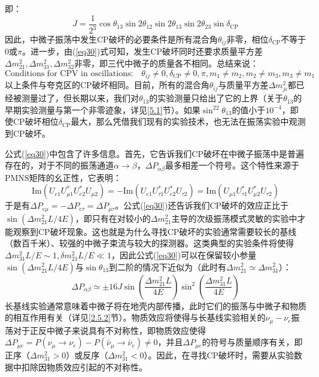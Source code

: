 \documentclass{article}
\begin{document}
	即：
	\begin{equation*}
		J=\frac{1}{2^3}\cos\theta_{13}\sin2\theta_{12}\sin2\theta_{13}\sin2\theta_{23}\sin\delta_{\mathrm{CP}}
	\end{equation*}
	因此，中微子振荡中发生CP破坏的必要条件是所有混合角$\theta_{ij}$非零，相位$\delta_\mathrm{CP}$不等于$0$或$\pi$。进一步，由(\ref{eq30})式可知，发生CP破坏同时还要求质量平方差$\Delta m_{21}^2,\Delta m_{31}^2,\Delta m_{32}^2$非零，即三代中微子的质量各不相同。总结来说：
	\begin{equation}
		\text{Conditions for CPV in oscillations:}\quad\theta_{ij}\neq0, \delta_{\mathrm{CP}}\neq0,\pi, m_{1}\neq m_{2}, m_{2}\neq m_{3}, m_{3}\neq m_{1}
	\end{equation}
	以上条件与夸克区的CP破坏相同。目前，所有的混合角$\theta_{ij}$与质量平方差$\Delta m_{ji}^2$都已经被测量过了，但长期以来，我们对$\theta_{13}$的实验测量只给出了它的上界（关于$\theta_{13}$的早期实验测量与第一个非零迹象，详见\ref{5.1}节）。如果$\sin^22\theta_{13}$的值小于$10^{-4}$，即使CP破坏相位$\delta_\mathrm{CP}$最大，那么凭借我们现有的实验技术，也无法在振荡实验中观测到CP破坏。
	
	公式(\ref{eq30})中包含了许多信息。首先，它告诉我们CP破坏在中微子振荡中是普遍存在的，对于不同的振荡通道$\alpha\to\beta$，$\Delta P_{\alpha\beta}$最多相差一个符号。这个特性来源于PMNS矩阵的幺正性，它表明：
	\begin{equation}
		\mathrm{Im}(U_{e1}U_{\mu1}^*U_{e2}^*U_{\mu2})=-\mathrm{Im}(U_{e1}U_{\tau1}^*U_{e2}^*U_{\tau2})=\mathrm{Im}(U_{\mu1}U_{\tau1}^*U_{\mu2}^*U_{\tau2})
	\end{equation}
	于是有$\Delta P_{e\mu}=-\Delta P_{e\tau}=\Delta P_{\mu\tau}$。公式(\ref{eq30})还告诉我们CP破坏的效应正比于$\sin({\Delta m_{21}^2L}/{4E})$，即只有在对较小的$\Delta m_{21}^2$主导的次级振荡模式灵敏的实验中才能观察到CP破坏现象。这也就是为什么寻找CP破坏的实验通常需要较长的基线（数百千米）、较强的中微子束流与较大的探测器。这类典型的实验条件将使得$\Delta m_{31}^2L/E\sim 1,\delta m_{21}^2L/E\ll1$，因此公式(\ref{eq30})可以在保留较小参量$\sin(\Delta m_{21}^2L/4E)$与$\sin\theta_{13}$到二阶的情况下近似为（此时有$\Delta m_{21}^2\simeq\Delta m_{31}^2$）：
	\begin{equation}
		\Delta P_{\alpha\beta} \simeq \pm16J \sin\left(\frac{\Delta m_{21}^2L}{4E}\right)\sin^2\left(\frac{\Delta m_{31}^2L}{4E}\right)
	\end{equation}
	长基线实验通常意味着中微子将在地壳内部传播，此时它们的振荡与中微子和物质的相互作用有关（详见\ref{2.5.2}节）。物质效应将使得与长基线实验相关的$\nu_\mu-\nu_e$振荡对于正反中微子来说具有不对称性，即物质效应使得$\Delta P_{\mu e}=P(\nu_\mu\to\nu_e)-P(\bar{\nu}_\mu\to\bar{\nu}_e)\ne0$，并且$\Delta P_{\mu e}$的符号与质量顺序有关，即正序（$\Delta m_{31}^2>0$）或反序（$\Delta m_{31}^2<0$）。因此，在寻找CP破坏时，需要从实验数据中扣除因物质效应引起的不对称性。
	
\end{document}
